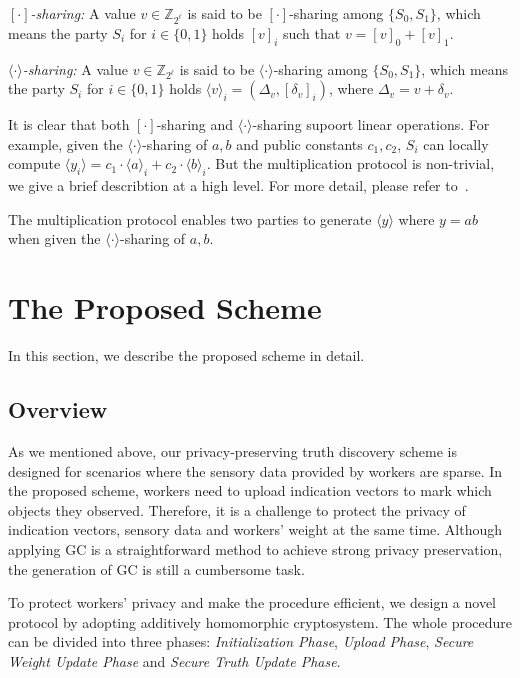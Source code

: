 \documentclass[conference]{IEEEtran}
\begin{document}
\textit{$[\cdot]$-sharing:} A value $v\in\mathbb{Z}_{2^\ell}$ is said to be $[\cdot]$-sharing among $\{S_0, S_1\}$, which means the party $S_i$ for $i\in\{0,1\}$ holds $[v]_i$ such that $v = [v]_0 + [v]_1$.

\textit{$\langle \cdot \rangle$-sharing:} A value $v\in\mathbb{Z}_{2^\ell}$ is said to be $\langle \cdot \rangle$-sharing among $\{S_0, S_1\}$, which means the party $S_i$ for $i\in\{0,1\}$ holds $\langle v \rangle_i = (\Delta_v, [\delta_v]_i)$, where $\Delta_v = v + \delta_v$.

It is clear that both $[\cdot]$-sharing and $\langle \cdot \rangle$-sharing supoort linear operations.
For example, given the $\langle \cdot \rangle$-sharing of $a,b$ and public constants $c_1,c_2$, $S_i$ can locally compute $\langle y_i \rangle = c_1 \cdot \langle a \rangle_i + c_2 \cdot \langle b \rangle_i$.
But the multiplication protocol is non-trivial, we give a brief describtion at a high level.
For more detail, please refer to~\cite{patra_aby20_2020}.

The multiplication protocol enables two parties to generate $\langle y \rangle$ where $y = ab$ when given the $\langle \cdot \rangle$-sharing of $a,b$.
\fi


\section{The Proposed Scheme}\label{sec5}

In this section, we describe the proposed scheme in detail.

\subsection{Overview}

As we mentioned above, our privacy-preserving truth discovery scheme is designed for scenarios where the sensory data provided by workers are sparse.
In the proposed scheme, workers need to upload indication vectors to mark which objects they observed.
Therefore, it is a challenge to protect the privacy of indication vectors, sensory data and workers' weight at the same time.
Although applying GC is a straightforward method to achieve strong privacy preservation, the generation of GC is still a cumbersome task.

To protect workers' privacy and make the procedure efficient, we design a novel protocol by adopting additively homomorphic cryptosystem.
The whole procedure can be divided into three phases: {\em Initialization Phase}, {\em Upload Phase}, {\em Secure Weight Update Phase} and {\em Secure Truth Update Phase}.
\end{document}
